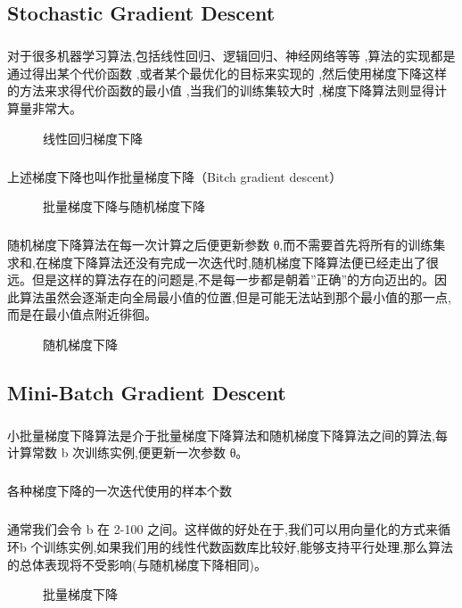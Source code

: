 \documentclass{article}
\begin{document}
\begin{CJK}{UTF8}{gbsn}
\subsection{Stochastic Gradient Descent}
\subparagraph{}
对于很多机器学习算法,包括线性回归、逻辑回归、神经网络等等 ,算法的实现都是通过得出某个代价函数 ,或者某个最优化的目标来实现的 ,然后使用梯度下降这样的方法来求得代价函数的最小值 ,当我们的训练集较大时 ,梯度下降算法则显得计算量非常大。
\begin{figure}[H]
\label{fig:11105}
\caption{线性回归梯度下降}
\end{figure}
\subparagraph{}
上述梯度下降也叫作批量梯度下降（Bitch gradient descent）
\begin{figure}[H]
\label{fig:11106}
\caption{批量梯度下降与随机梯度下降}
\end{figure}
\subparagraph{}
随机梯度下降算法在每一次计算之后便更新参数 θ,而不需要首先将所有的训练集求和,在梯度下降算法还没有完成一次迭代时,随机梯度下降算法便已经走出了很远。但是这样的算法存在的问题是,不是每一步都是朝着”正确”的方向迈出的。因此算法虽然会逐渐走向全局最小值的位置,但是可能无法站到那个最小值的那一点,而是在最小值点附近徘徊。
\begin{figure}[H]
\label{fig:11107}
\caption{随机梯度下降}
\end{figure}
\begin{figure}[H]
\label{fig:11108}
\end{figure}
\begin{figure}[H]
\label{fig:11109}
\end{figure}
\subsection{Mini-Batch Gradient Descent}
\subparagraph{}
小批量梯度下降算法是介于批量梯度下降算法和随机梯度下降算法之间的算法,每计算常数 b 次训练实例,便更新一次参数 θ。
\subparagraph{}
各种梯度下降的一次迭代使用的样本个数
\subparagraph{}
通常我们会令 b 在 2-100 之间。这样做的好处在于,我们可以用向量化的方式来循环b 个训练实例,如果我们用的线性代数函数库比较好,能够支持平行处理,那么算法的总体表现将不受影响(与随机梯度下降相同)。
\begin{figure}[H]
\label{fig:11110}
\end{figure}
\begin{figure}[H]
\label{fig:11112}
\caption{批量梯度下降}
\end{figure}
\begin{figure}[H]
\label{fig:11111}
\end{figure}

\end{CJK}
\end{document}
